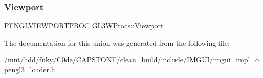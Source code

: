 \subsubsection{\texorpdfstring{Viewport}{Viewport}}
{\footnotesize\ttfamily P\+F\+N\+G\+L\+V\+I\+E\+W\+P\+O\+R\+T\+P\+R\+OC G\+L3\+W\+Procs\+::\+Viewport}



The documentation for this union was generated from the following file\+:\begin{DoxyCompactItemize}
\item 
/mnt/hdd/fnky/\+C0de/\+C\+A\+P\+S\+T\+O\+N\+E/clean\+\_\+build/include/\+I\+M\+G\+U\+I/\hyperlink{imgui__impl__opengl3__loader_8h}{imgui\+\_\+impl\+\_\+opengl3\+\_\+loader.\+h}\end{DoxyCompactItemize}
